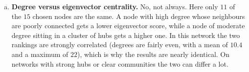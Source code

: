 \documentclass[a4paper, 11pt]{article}
\begin{document}
\begin{solution}
\begin{enumerate}[(a)]
    \item \textbf{Degree versus eigenvector centrality.} No, not always. Here only $11$ of the $15$ chosen nodes are the same. A node with high degree whose neighbours are poorly connected gets a lower eigenvector score, while a node of moderate degree sitting in a cluster of hubs gets a higher one. In this network the two rankings are strongly correlated (degrees are fairly even, with a mean of $10.4$ and a maximum of $22$), which is why the results are nearly identical. On networks with strong hubs or clear communities the two can differ a lot.
\end{enumerate}
\end{solution}
\problemend

\clearpage
\end{document}
